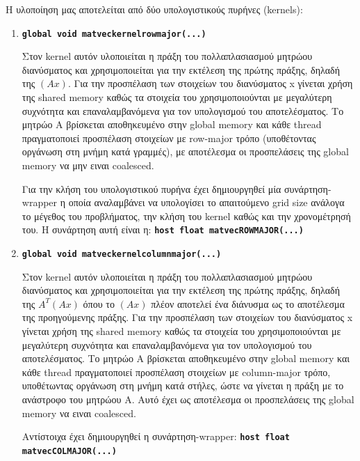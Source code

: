 Η υλοποίηση μας αποτελείται από δύο υπολογιστικούς πυρήνες (kernels):
\begin{enumerate}
    \item \textbf{\texttt{\textunderscore\textunderscore global\textunderscore\textunderscore\ void matvec\textunderscore kernel\textunderscore row\textunderscore major(...)}}
    
    Στον kernel αυτόν υλοποιείται η πράξη του πολλαπλασιασμού μητρώου διανύσματος και χρησιμοποιείται για την εκτέλεση της πρώτης πράξης, δηλαδή της $(Ax)$. Για την προσπέλαση των στοιχείων του διανύσματος x γίνεται χρήση της shared memory καθώς τα στοιχεία του χρησιμοποιούνται με μεγαλύτερη συχνότητα και επαναλαμβανόμενα για τον υπολογισμού του αποτελέσματος. Το μητρώο Α βρίσκεται αποθηκευμένο στην global memory και κάθε thread πραγματοποιεί προσπέλαση στοιχείων με row-major τρόπο (υποθέτοντας οργάνωση στη μνήμη κατά γραμμές), με αποτέλεσμα οι προσπελάσεις της global memory να μην ειναι coalesced.
    
    Για την κλήση του υπολογιστικού πυρήνα έχει δημιουργηθεί μία συνάρτηση-wrapper η οποία αναλαμβάνει να υπολογίσει το απαιτούμενο grid size ανάλογα το μέγεθος του προβλήματος, την κλήση του kernel καθώς και την χρονομέτρησή του. Η συνάρτηση αυτή είναι η: \textbf{\texttt{\textunderscore\textunderscore host\textunderscore\textunderscore\  float matvec\textunderscore ROW\textunderscore MAJOR(...)}}
    
    
    
     
     
    \item \textbf{\texttt{\textunderscore\textunderscore global\textunderscore\textunderscore\ void matvec\textunderscore kernel\textunderscore column\textunderscore major(...)}}
    
    Στον kernel αυτόν υλοποιείται η πράξη του πολλαπλασιασμού μητρώου διανύσματος και χρησιμοποιείται για την εκτέλεση της πρώτης πράξης, δηλαδή της $A^{T}(Ax)$ όπου το $(Ax)$ πλέον αποτελεί ένα διάνυσμα ως το αποτέλεσμα της προηγούμενης πράξης. Για την προσπέλαση των στοιχείων του διανύσματος x γίνεται χρήση της shared memory καθώς τα στοιχεία του χρησιμοποιούνται με μεγαλύτερη συχνότητα και επαναλαμβανόμενα για τον υπολογισμού του αποτελέσματος. Το μητρώο Α βρίσκεται αποθηκευμένο στην global memory και κάθε thread πραγματοποιεί προσπέλαση στοιχείων με column-major τρόπο, υποθέτωντας οργάνωση στη μνήμη κατά στήλες, ώστε να γίνεται η πράξη με το ανάστροφο του μητρώου Α. Αυτό έχει ως αποτέλεσμα οι προσπελάσεις της global memory να ειναι coalesced. 
    
    Αντίστοιχα έχει δημιουργηθεί η συνάρτηση-wrapper:
    \textbf{\texttt{\textunderscore\textunderscore host\textunderscore\textunderscore\  float matvec\textunderscore COL\textunderscore MAJOR(...)}}
\end{enumerate}

